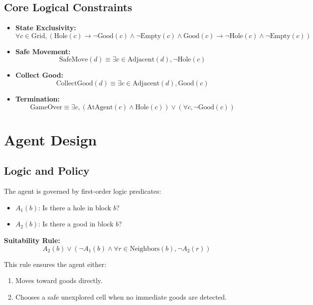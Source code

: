 \documentclass[12pt]{article}
\begin{document}
\subsection{Core Logical Constraints}

\begin{itemize}
    \item \textbf{State Exclusivity:}
    \[
    \forall c \in \text{Grid}, \left(
        \text{Hole}(c) \rightarrow \neg\text{Good}(c) \land \neg\text{Empty}(c) \land
        \text{Good}(c) \rightarrow \neg\text{Hole}(c) \land \neg\text{Empty}(c)
    \right)
    \]
    
    \item \textbf{Safe Movement:}
    \[
    \text{SafeMove}(d) \equiv \exists c \in \text{Adjacent}(d), \neg\text{Hole}(c)
    \]

    \item \textbf{Collect Good:}
    \[
    \text{CollectGood}(d) \equiv \exists c \in \text{Adjacent}(d), \text{Good}(c)
    \]

    \item \textbf{Termination:}
    \[
    \text{GameOver} \equiv \exists c, \left(\text{AtAgent}(c) \land \text{Hole}(c)\right) \lor \left( \forall c, \neg\text{Good}(c) \right)
    \]
\end{itemize}

\section{Agent Design}

\subsection{Logic and Policy}

The agent is governed by first-order logic predicates:
\begin{itemize}
    \item $A_1(b)$: Is there a hole in block $b$?
    \item $A_2(b)$: Is there a good in block $b$?
\end{itemize}

\textbf{Suitability Rule:}
\[
A_2(b) \lor \left( \neg A_1(b) \land \forall r \in \text{Neighbors}(b), \neg A_2(r) \right)
\]

This rule ensures the agent either:
\begin{enumerate}
    \item Moves toward goods directly.
    \item Chooses a safe unexplored cell when no immediate goods are detected.
\end{enumerate}
\end{document}
